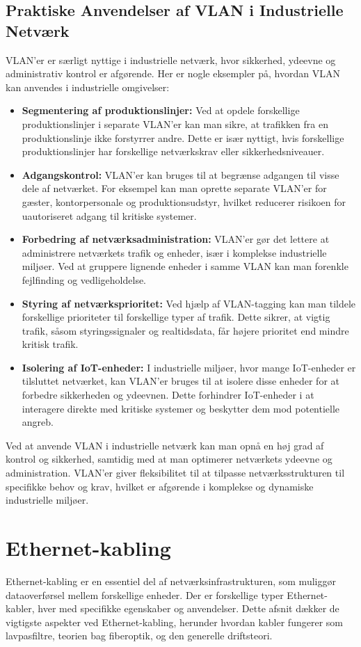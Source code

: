 \subsection{Praktiske Anvendelser af VLAN i Industrielle Netværk}
VLAN'er er særligt nyttige i industrielle netværk, hvor sikkerhed, ydeevne og administrativ kontrol er afgørende. Her er nogle eksempler på, hvordan VLAN kan anvendes i industrielle omgivelser:
\begin{itemize}
	\item \textbf{Segmentering af produktionslinjer:} Ved at opdele forskellige produktionslinjer i separate VLAN'er kan man sikre, at trafikken fra en produktionslinje ikke forstyrrer andre. Dette er især nyttigt, hvis forskellige produktionslinjer har forskellige netværkskrav eller sikkerhedsniveauer.
	\item \textbf{Adgangskontrol:} VLAN'er kan bruges til at begrænse adgangen til visse dele af netværket. For eksempel kan man oprette separate VLAN'er for gæster, kontorpersonale og produktionsudstyr, hvilket reducerer risikoen for uautoriseret adgang til kritiske systemer.
	\item \textbf{Forbedring af netværksadministration:} VLAN'er gør det lettere at administrere netværkets trafik og enheder, især i komplekse industrielle miljøer. Ved at gruppere lignende enheder i samme VLAN kan man forenkle fejlfinding og vedligeholdelse.
	\item \textbf{Styring af netværksprioritet:} Ved hjælp af VLAN-tagging kan man tildele forskellige prioriteter til forskellige typer af trafik. Dette sikrer, at vigtig trafik, såsom styringssignaler og realtidsdata, får højere prioritet end mindre kritisk trafik.
	\item \textbf{Isolering af IoT-enheder:} I industrielle miljøer, hvor mange IoT-enheder er tilsluttet netværket, kan VLAN'er bruges til at isolere disse enheder for at forbedre sikkerheden og ydeevnen. Dette forhindrer IoT-enheder i at interagere direkte med kritiske systemer og beskytter dem mod potentielle angreb.
\end{itemize}

\noindent Ved at anvende VLAN i industrielle netværk kan man opnå en høj grad af kontrol og sikkerhed, samtidig med at man optimerer netværkets ydeevne og administration. VLAN'er giver fleksibilitet til at tilpasse netværksstrukturen til specifikke behov og krav, hvilket er afgørende i komplekse og dynamiske industrielle miljøer.


\section{Ethernet-kabling}
Ethernet-kabling er en essentiel del af netværksinfrastrukturen, som muliggør dataoverførsel mellem forskellige enheder. Der er forskellige typer Ethernet-kabler, hver med specifikke egenskaber og anvendelser. Dette afsnit dækker de vigtigste aspekter ved Ethernet-kabling, herunder hvordan kabler fungerer som lavpasfiltre, teorien bag fiberoptik, og den generelle driftsteori.

